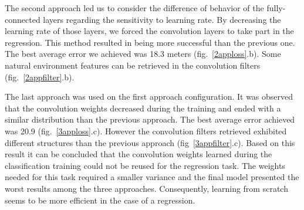 The second approach led us to consider the difference of behavior of the fully-connected layers regarding the sensitivity to learning rate. By decreasing the learning rate of those layers, we forced the convolution layers to take part in the regression. This method resulted in being more successful than the previous one. The best average error we achieved was 18.3 meters (fig.~\ref{2apploss}.b). Some natural environment features can be retrieved in the convolution filters (fig.~\ref{2appfilter}.b).

The last approach was used on the first approach configuration. It was observed that the convolution weights decreased during the training and ended with a similar distribution than the previous approach. The best average error achieved was 20.9 (fig.~\ref{3apploss}.c). However the convolution filters retrieved exhibited different structures than the previous approach (fig~\ref{3appfilter}.c). Based on this result it can be concluded that the convolution weights learned during the classification training could not be reused for the regression task. The weights needed for this task required a smaller variance and the final model presented the worst results among the three approaches. Consequently, learning from scratch seems to be more efficient in the case of a regression.




